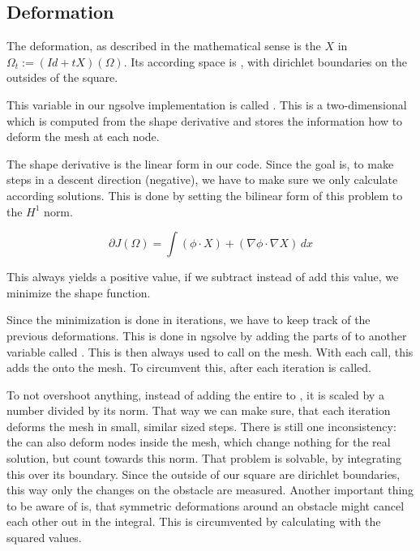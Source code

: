 \subsection{Deformation}
The deformation, as described in the mathematical sense is the $X$ in $\Omega_t := (Id + tX )(\Omega)$.
Its according space is , with dirichlet boundaries on the outsides of the square.

This variable in our ngsolve implementation is called . This is a two-dimensional  which is computed from the shape derivative and stores the information how to deform the mesh at each node.

The shape derivative is the linear form  in our code. Since the goal is, to make steps in a descent direction (negative), we have to make sure we only calculate according solutions.
This is done by setting the bilinear form of this problem to the $H^1$ norm.

\begin{equation}
	\partial J(\Omega) = \int(\phi\cdot X)+(\nabla\phi\cdot \nabla X) \, dx
\end{equation}

This always yields a positive value, if we subtract instead of add this value, we minimize the shape function.

\begin{comment}
\begin{lstlisting}[language=Python, title=Solving For The Deformation, label=lst:deformation_solve]
	def SolveDeformationEquation():
	rhs = gfX.vec.CreateVector()
	rhs.data = dJOmega.vec - b.mat * gfX.vec
	update = gfX.vec.CreateVector()
	update.data = b.mat.Inverse(VEC.FreeDofs()) * rhs
	gfX.vec.data += update
\end{lstlisting}
\end{comment}

Since the minimization is done in iterations, we have to keep track of the previous deformations. This is done in ngsolve by adding the parts of  to another variable called . This  is then always used to call  on the mesh.
With each call, this adds the  onto the mesh. To circumvent this, after each iteration  is called.

To not overshoot anything, instead of adding the entire  to , it is scaled by a number divided by its norm. That way we can make sure, that each iteration deforms the mesh in small, similar sized steps.
There is still one inconsistency: the  can also deform nodes inside the mesh, which change nothing for the real solution, but count towards this norm. That problem is solvable, by integrating this  over its boundary. Since the outside of our square are dirichlet boundaries, this way only the changes on the obstacle are measured. Another important thing to be aware of is, that symmetric deformations around an obstacle might cancel each other out in the integral. This is circumvented by calculating with the squared values.




